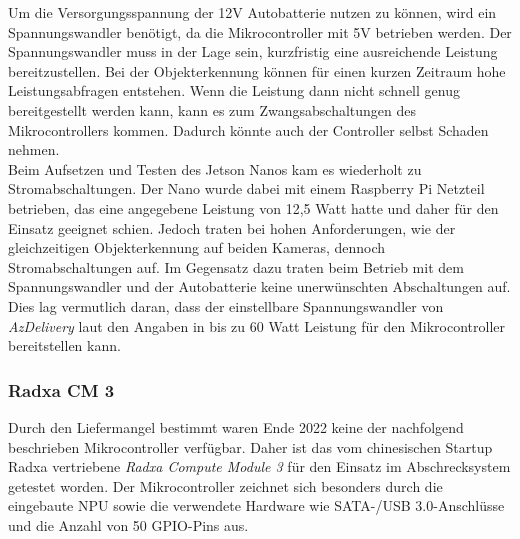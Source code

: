 Um die Versorgungsspannung der 12V Autobatterie nutzen zu können, wird ein Spannungswandler benötigt, da die Mikrocontroller mit 5V betrieben werden. Der Spannungswandler muss in der Lage sein, kurzfristig eine ausreichende Leistung bereitzustellen. Bei der Objekterkennung können für einen kurzen Zeitraum hohe Leistungsabfragen entstehen. Wenn die Leistung dann nicht schnell genug bereitgestellt werden kann, kann es zum Zwangsabschaltungen des Mikrocontrollers kommen. Dadurch könnte auch der Controller selbst Schaden nehmen.
\\
Beim Aufsetzen und Testen des Jetson Nanos kam es wiederholt zu Stromabschaltungen. Der Nano wurde dabei mit einem Raspberry Pi Netzteil betrieben, das eine angegebene Leistung von 12,5 Watt hatte und daher für den Einsatz geeignet schien. Jedoch traten bei hohen Anforderungen, wie der gleichzeitigen Objekterkennung auf beiden Kameras, dennoch Stromabschaltungen auf. Im Gegensatz dazu traten beim Betrieb mit dem Spannungswandler und der Autobatterie keine unerwünschten Abschaltungen auf. Dies lag vermutlich daran, dass der einstellbare Spannungswandler von \textit{AzDelivery} laut den Angaben in \cite{am_spannungswandler} bis zu 60 Watt Leistung für den Mikrocontroller bereitstellen kann.

\subsubsection{Radxa \ac{CM} 3}

Durch den Liefermangel bestimmt waren Ende 2022 keine der nachfolgend beschrieben Mikrocontroller verfügbar. Daher ist das vom chinesischen Startup Radxa vertriebene \textit{Radxa Compute Module 3} für den Einsatz im Abschrecksystem getestet worden. Der Mikrocontroller zeichnet sich besonders durch die eingebaute \ac{NPU} sowie die verwendete Hardware wie \ac{SATA}-/USB 3.0-Anschlüsse und die Anzahl von 50 \ac{GPIO}-Pins aus. \cite{radxa}

